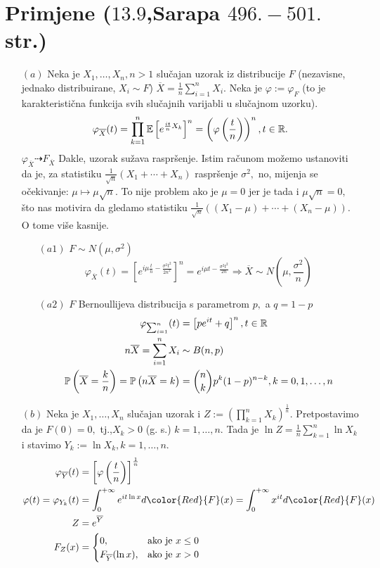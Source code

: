 \documentclass{article}
\begin{document}
\section{Primjene (\textsection \(13.9\),Sarapa \(496.-501.\) str.)}
\begin{enumerate}
    \item[\((a)\)] Neka je \(X_1,\ldots,X_n,n>1\) slučajan uzorak iz distribucije \(F\) (nezavisne, jednako distribuirane, \(X_i\sim F\)) \(\overline X=\frac1n\sum_{i=1}^nX_i.\) Neka je \(\varphi:=\varphi_F\) (to je karakteristična funkcija svih slučajnih varijabli u slučajnom uzorku). \[\varphi_{\overline X}(t)=\prod_{k=1}^n\Bbb E\left[e^{\frac{it}nX_k}\right]^n=\left(\varphi\left(\frac{t}n\right)\right)^n,t\in\Bbb R.\] \(\varphi_{\overline X}\dashrightarrow F_{\overline X}\) Dakle, uzorak sužava raspršenje. Istim računom možemo ustanoviti da je, za statistiku \(\frac1{\sqrt n}(X_1+\cdots+X_n)\) raspršenje \(\sigma^2,\) no, mijenja se očekivanje: \(\mu\mapsto\mu\sqrt n.\) To nije problem ako je \(\mu=0\) jer je tada i \(\mu\sqrt n=0,\) što nas motivira da gledamo statistiku \(\frac1{\sqrt n}((X_1-\mu)+\cdots+(X_n-\mu)).\) O tome više kasnije.  \begin{enumerate}
        \item[\((a1)\)] \(F\sim N(\mu,\sigma^2)\) \[\varphi_{\overline X}(t)=\left[e^{i\mu\frac{t}n-\frac{\sigma^2t^2}{2n^2}}\right]^n=e^{i\mu t-\frac{\sigma^2t^2}{2n}}\Rightarrow\overline X\sim N\left(\mu,\frac{\sigma^2}n\right)\] 
        \item[\((a2)\)] \(F\) Bernoullijeva distribucija s parametrom \(p,\) a \(q=1-p\) \[\begin{aligned}\varphi_{\sum_{i=1}^n}(t)&=\left[pe^{it}+q\right]^n,t\in\Bbb R\\n\overline X=\sum_{i=1}^nX_i&\sim B(n,p)\\\Bbb P\left(\overline X=\frac{k}n\right)=\Bbb P\left(n\overline X=k\right)&=\binom{n}kp^k(1-p)^{n-k},k=0,1,\ldots,n\end{aligned}\]  
    \end{enumerate}
    \item[\((b)\)] Neka je \(X_1,\ldots,X_n\) slučajan uzorak i \(Z:=\displaystyle\left(\prod_{k=1}^nX_k\right)^{\frac1n}.\) Pretpostavimo da je \(F(0)=0,\) tj.,\newline \(X_k>0\) (g. s.) \(k=1,\ldots,n.\) Tada je \(\displaystyle\ln Z=\frac1n\sum_{k=1}^n\ln X_k\) i stavimo \(Y_k:=\ln X_k,k=1,\ldots,n.\) \[\begin{aligned}\varphi_{\overline Y}(t)&=\left[\varphi\left(\frac{t}n\right)\right]^{\frac1n}\\\varphi(t)=\varphi_{Y_k}(t)&=\int_0^{+\infty}e^{it\ln x}d{\color{Red}{F}}(x)=\int_0^{+\infty}x^{it}d{\color{Red}{F}}(x)\\Z&=e^{\overline Y}\\F_Z(x)&=\begin{cases}0,&\text{ako je }x\le 0\\F_{\overline Y}(\ln x),&\text{ako je }x>0\end{cases}\end{aligned}\] \begin{enumerate}

\end{enumerate}
\end{enumerate}
\end{document}

